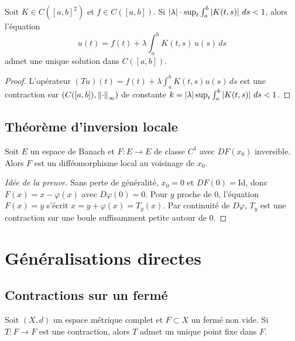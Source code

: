 \begin{theoreme}
Soit $K \in C([a,b]^2)$ et $f \in C([a,b])$. Si
$\left| \lambda \right| \cdot \sup_{t} \int_a^b \left| K(t,s) \right| \, ds < 1$,
alors l'\'equation
\[
    u(t) = f(t) + \lambda \int_a^b K(t,s) \, u(s) \, ds
\]
admet une unique solution dans $C([a,b])$.
\end{theoreme}

\begin{proof}
L'op\'erateur $(Tu)(t) = f(t) + \lambda \int_a^b K(t,s) u(s) \, ds$ est une
contraction sur $(C([a,b]), \left\| \cdot \right\|_\infty)$ de constante
$k = \left| \lambda \right| \sup_t \int_a^b \left| K(t,s) \right| \, ds < 1$.
\end{proof}

\subsection{Th\'eor\`eme d'inversion locale}

\begin{theoreme}
Soit $E$ un espace de Banach et $F : E \to E$ de classe $C^1$ avec
$DF(x_0)$ inversible. Alors $F$ est un diff\'eomorphisme local au voisinage de $x_0$.
\end{theoreme}

\begin{proof}[Id\'ee de la preuve]
Sans perte de g\'en\'eralit\'e, $x_0 = 0$ et $DF(0) = \mathrm{Id}$, donc
$F(x) = x - \varphi(x)$ avec $D\varphi(0) = 0$. Pour $y$ proche de $0$,
l'\'equation $F(x) = y$ s'\'ecrit $x = y + \varphi(x) = T_y(x)$.
Par continuit\'e de $D\varphi$, $T_y$ est une contraction sur une boule
suffisamment petite autour de $0$.
\end{proof}

\section{G\'en\'eralisations directes}

\subsection{Contractions sur un ferm\'e}

\begin{proposition}
Soit $(X, d)$ un espace m\'etrique complet et $F \subset X$ un ferm\'e non vide.
Si $T : F \to F$ est une contraction, alors $T$ admet un unique point fixe
dans $F$.
\end{proposition}

